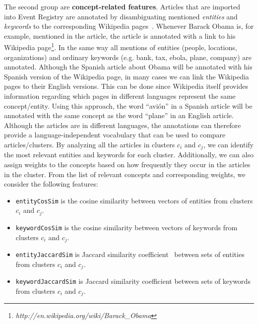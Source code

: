 \documentclass[twoside,11pt]{article}
\begin{document}
The second group are {\bf concept-related features}. Articles that are imported into Event Registry are annotated by disambiguating mentioned \emph{entities} and \emph{keywords} to the corresponding Wikipedia pages~\cite{zhang2014}. Whenever Barack Obama is, for example, mentioned in the article, the article is annotated with a link to his Wikipedia page\footnote{\emph{http://en.wikipedia.org/wiki/Barack\_Obama}}. In the same way all mentions of entities (people, locations, organizations) and ordinary keywords (e.g. bank, tax, ebola, plane, company) are annotated. Although the Spanish article about Obama will be annotated with his Spanish version of the Wikipedia page, in many cases we can link the Wikipedia pages to their English versions. This can be done since Wikipedia itself provides information regarding which pages in different languages represent the same concept/entity. Using this approach, the word ``avi\'on'' in a Spanish article will be annotated with the same concept as the word ``plane'' in an English article. Although the articles are in different languages, the annotations can therefore provide a language-independent vocabulary that can be used to compare articles/clusters. By analyzing all the articles in clusters $c_i$ and $c_j$, we can identify the most relevant entities and keywords for each cluster. Additionally, we can also assign weights to the concepts based on how frequently they occur in the articles in the cluster. From the list of relevant concepts and corresponding weights, we consider the following features:

\begin{itemize}
\item \texttt{entityCosSim} is the cosine similarity between vectors of entities from clusters $c_i$ and $c_j$.
\item \texttt{keywordCosSim} is the cosine similarity between vectors of keywords from clusters $c_i$ and $c_j$.
\item \texttt{entityJaccardSim} is  Jaccard similarity coefficient~\cite{levandowsky1971} between sets of entities from clusters $c_i$ and $c_j$.
\item \texttt{keywordJaccardSim} is  Jaccard similarity coefficient between sets of keywords from clusters $c_i$ and $c_j$.
\end{itemize}
\end{document}
